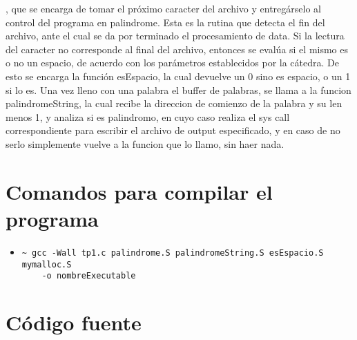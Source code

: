 \documentclass[a4paper,10pt]{article}
\begin{document}
{, que se encarga de tomar el próximo caracter del archivo y entregárselo al control del programa en
palindrome. Esta es la rutina que detecta el fin del archivo, ante el cual se da por terminado el
procesamiento de data. Si la lectura del caracter no corresponde al final del archivo, entonces se evalúa si el mismo es o no un espacio, de acuerdo con los parámetros establecidos por la cátedra. De esto se encarga la función esEspacio, la cual devuelve un 0 sino es espacio, o un 1 si lo es. Una vez lleno con una palabra el buffer de palabras, se llama a la funcion palindromeString, la cual recibe la direccion de comienzo de la palabra y su len menos 1, y analiza si es palindromo, en cuyo caso realiza el sys call correspondiente para escribir el archivo de output especificado, y en caso de no serlo simplemente vuelve a la funcion que lo llamo, sin haer nada.
	
}

\section{Comandos para compilar el programa}

\begin{itemize}
\item 
\begin{verbatim}
~ gcc -Wall tp1.c palindrome.S palindromeString.S esEspacio.S mymalloc.S 
	-o nombreExecutable
\end{verbatim}
\end{itemize}

\section{Código fuente}
\end{document}
